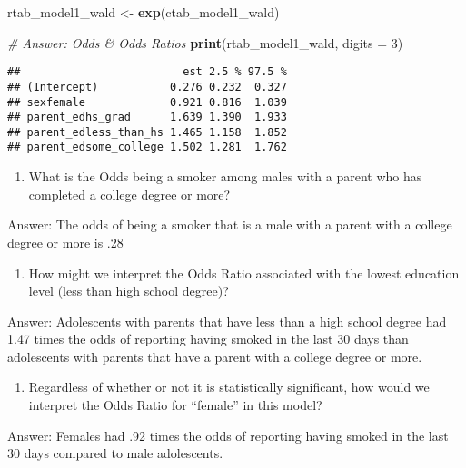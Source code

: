 \documentclass[]{article}
\newenvironment{Shaded}{\begin{snugshade}}{\end{snugshade}}
\newcommand{\CommentTok}[1]{\textcolor[rgb]{0.56,0.35,0.01}{\textit{#1}}}
\newcommand{\DataTypeTok}[1]{\textcolor[rgb]{0.13,0.29,0.53}{#1}}
\newcommand{\DecValTok}[1]{\textcolor[rgb]{0.00,0.00,0.81}{#1}}
\newcommand{\KeywordTok}[1]{\textcolor[rgb]{0.13,0.29,0.53}{\textbf{#1}}}
\newcommand{\NormalTok}[1]{#1}
\newcommand{\StringTok}[1]{\textcolor[rgb]{0.31,0.60,0.02}{#1}}
\providecommand{\tightlist}{%
  \setlength{\itemsep}{0pt}\setlength{\parskip}{0pt}}
\begin{document}
\begin{Shaded}
\begin{Highlighting}[]
\NormalTok{rtab_model1_wald <-}\StringTok{ }\KeywordTok{exp}\NormalTok{(ctab_model1_wald)}

\CommentTok{# Answer: Odds & Odds Ratios}
\KeywordTok{print}\NormalTok{(rtab_model1_wald, }\DataTypeTok{digits =} \DecValTok{3}\NormalTok{)}
\end{Highlighting}
\end{Shaded}

\begin{verbatim}
##                         est 2.5 % 97.5 %
## (Intercept)           0.276 0.232  0.327
## sexfemale             0.921 0.816  1.039
## parent_edhs_grad      1.639 1.390  1.933
## parent_edless_than_hs 1.465 1.158  1.852
## parent_edsome_college 1.502 1.281  1.762
\end{verbatim}

\begin{enumerate}
\def\labelenumi{\alph{enumi}.}
\tightlist
\item
  What is the Odds being a smoker among males with a parent who has
  completed a college degree or more?
\end{enumerate}

Answer: The odds of being a smoker that is a male with a parent with a
college degree or more is .28

\begin{enumerate}
\def\labelenumi{\alph{enumi}.}
\setcounter{enumi}{1}
\tightlist
\item
  How might we interpret the Odds Ratio associated with the lowest
  education level (less than high school degree)?
\end{enumerate}

Answer: Adolescents with parents that have less than a high school
degree had 1.47 times the odds of reporting having smoked in the last 30
days than adolescents with parents that have a parent with a college
degree or more.

\begin{enumerate}
\def\labelenumi{\alph{enumi}.}
\setcounter{enumi}{2}
\tightlist
\item
  Regardless of whether or not it is statistically significant, how
  would we interpret the Odds Ratio for ``female'' in this model?
\end{enumerate}

Answer: Females had .92 times the odds of reporting having smoked in the
last 30 days compared to male adolescents.
\end{document}
